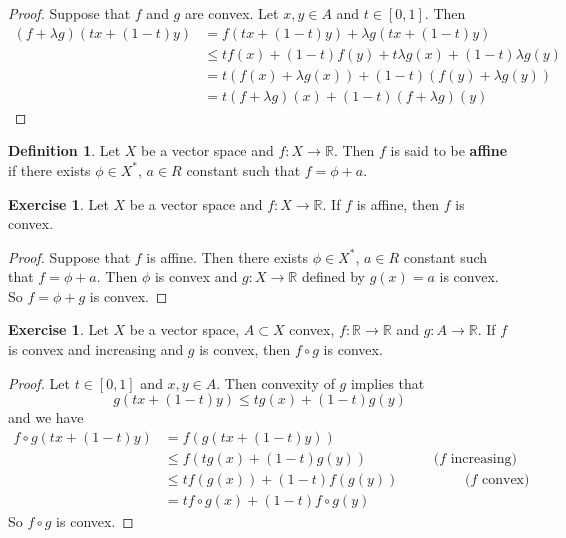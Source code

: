 \documentclass[12pt]{amsart}
\theoremstyle{definition}
\newtheorem{defn}[definition]{Definition}
\theoremstyle{remark}
\theoremstyle{definition}
\newtheorem{ex}[definition]{Exercise}
\newcommand{\lam}{\lambda}
\newcommand{\R}{\mathbb{R}}
\begin{document}
	\begin{proof}
	Suppose that $f$ and $g$ are convex. Let $x,y \in A$ and $t \in [0,1]$. Then 
	\begin{align*}
	(f + \lam g)(tx + (1-t)y) 
	&= f(tx + (1-t)y) + \lam g(tx + (1-t)y) \\
	& \leq tf(x) + (1-t)f(y) +  t \lam g(x) + (1-t)\lam g(y) \\
	&= t(f(x) + \lam g(x)) + (1-t)(f(y) + \lam g(y))\\
	& = t(f + \lam g)(x) + (1-t)(f + \lam g)(y)
\end{align*}		 
	\end{proof}
	
	
	\begin{defn}
	Let $X$ be a vector space and $f: X \rightarrow \R$. Then $f$ is said to be \textbf{affine} if there exists $\phi \in X^*$, $a \in R$ constant such that $f = \phi + a$.\\
	\end{defn}
	
	\begin{ex}
	Let $X$ be a vector space and $f: X \rightarrow \R$. If $f$ is affine, then $f$ is convex.
	\end{ex}
	
	\begin{proof}
	Suppose that $f$ is affine. Then there exists $\phi \in X^*$, $a \in R$ constant such that $f = \phi + a$. Then $\phi$ is convex and $g: X \rightarrow \R$ defined by $g(x) = a$ is convex. So $f = \phi + g$ is convex.
	\end{proof}
	
	\begin{ex}
	Let $X$ be a vector space, $A \subset X$ convex, $f:\R \rightarrow \R$ and $g: A \rightarrow \R$. If $f$ is convex and increasing and $g$ is convex, then $f \circ g$ is convex.
	\end{ex}	
	
	\begin{proof}
	Let $t \in [0,1]$ and $x, y \in A$. Then convexity of $g$ implies that $$g(tx +(1-t)y) \leq tg(x) + (1-t)g(y)$$ and we have
	\begin{align*}
	f\circ g(tx +(1-t)y) 
	&= f(g(tx +(1-t)y)) \\
	& \leq f(tg(x) + (1-t)g(y)) \hspace{2cm} (f \text{ increasing)}\\
	& \leq tf(g(x)) + (1-t)f(g(y)) \hspace{2cm}  (f \text{ convex)}\\	
	&= tf \circ g(x) + (1-t)f \circ g(y)
\end{align*}	 
So $f \circ g$ is convex.
	\end{proof}
	
\end{document}

